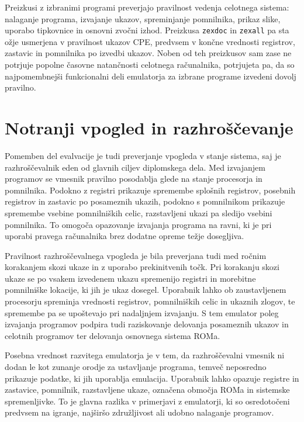 \documentclass[a4paper, 12pt, openright]{book}
\begin{document}
    Preizkusi z izbranimi programi preverjajo pravilnost vedenja celotnega sistema:
    nalaganje programa, izvajanje ukazov, spreminjanje pomnilnika, prikaz slike,
    uporabo tipkovnice in osnovni zvočni izhod. Preizkusa \texttt{zexdoc} in
    \texttt{zexall} pa sta ožje usmerjena v pravilnost ukazov CPE, predvsem v
    končne vrednosti registrov, zastavic in pomnilnika po izvedbi ukazov. Noben
    od teh preizkusov sam zase ne potrjuje popolne časovne natančnosti celotnega
    računalnika, potrjujeta pa, da so najpomembnejši funkcionalni deli
    emulatorja za izbrane programe izvedeni dovolj pravilno.

    \section{Notranji vpogled in razhroščevanje}

    Pomemben del evalvacije je tudi preverjanje vpogleda v stanje sistema, saj
    je razhroščevalnik eden od glavnih ciljev diplomskega dela. Med izvajanjem programov
    se vmesnik pravilno posodablja glede na stanje procesorja in pomnilnika.
    Podokno z registri prikazuje spremembe splošnih registrov, posebnih registrov
    in zastavic po posameznih ukazih, podokno s pomnilnikom prikazuje spremembe
    vsebine pomnilniških celic, razstavljeni ukazi pa sledijo vsebini pomnilnika.
    To omogoča opazovanje izvajanja programa na ravni, ki je pri uporabi pravega računalnika
    brez dodatne opreme težje dosegljiva.

    Pravilnost razhroščevalnega vpogleda je bila preverjana tudi med ročnim korakanjem
    skozi ukaze in z uporabo prekinitvenih točk. Pri korakanju skozi ukaze se po
    vsakem izvedenem ukazu spremenijo registri in morebitne pomnilniške lokacije,
    ki jih je ukaz dosegel. Uporabnik lahko ob zaustavljenem procesorju
    spreminja vrednosti registrov, pomnilniških celic in ukaznih zlogov, te
    spremembe pa se upoštevajo pri nadaljnjem izvajanju. S tem emulator poleg izvajanja
    programov podpira tudi raziskovanje delovanja posameznih ukazov in celotnih programov
    ter delovanja osnovnega sistema ROMa.

    Posebna vrednost razvitega emulatorja je v tem, da razhroščevalni vmesnik ni
    dodan le kot zunanje orodje za ustavljanje programa, temveč neposredno prikazuje
    podatke, ki jih uporablja emulacija. Uporabnik lahko opazuje registre in zastavice,
    pomnilnik, razstavljene ukaze, označena območja ROMa in sistemske
    spremenljivke. To je glavna razlika v primerjavi z emulatorji, ki so
    osredotočeni predvsem na igranje, najširšo združljivost ali udobno nalaganje programov.
\end{document}
